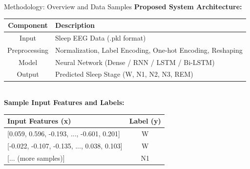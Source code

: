 \begin{frame}{Methodology: Overview and Data Samples}
		\centering
	\small
	\textbf{Proposed System Architecture:} \\[5pt]

	\begin{tabular}{|c|p{}|}
		\hline
		\textbf{Component} & \textbf{Description} \\
		\hline
		Input & Sleep EEG Data (.pkl format) \\
		\hline
		Preprocessing & Normalization, Label Encoding, One-hot Encoding, Reshaping \\
		\hline
		Model & Neural Network (Dense / RNN / LSTM / Bi-LSTM) \\
		\hline
		Output & Predicted Sleep Stage (W, N1, N2, N3, REM) \\
		\hline
	\end{tabular} \\[10pt]
	
	\textbf{Sample Input Features and Labels:} \\[5pt]
	\centering
	\begin{tabular}{|p{}|c|}
		\hline
		\textbf{Input Features (x)} & \textbf{Label (y)} \\
		\hline
		{[0.059, 0.596, -0.193, ..., -0.601, 0.201]} & W \\
		\hline
		{[-0.022, -0.107, -0.135, ..., 0.038, 0.103]} & W \\
		\hline
		{[... (more samples)]} & N1 \\
		\hline
	\end{tabular} \\[5pt]
	
 
	
\end{frame}



